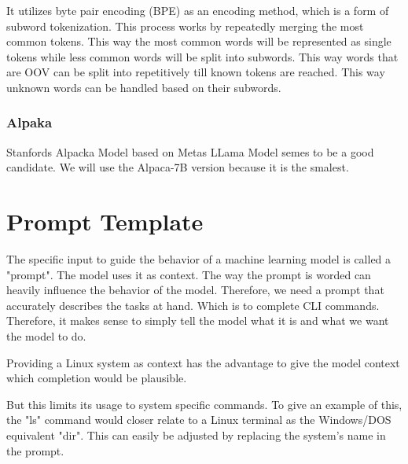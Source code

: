 It utilizes byte pair encoding (BPE) as an encoding method, which is a form of subword tokenization. This process works by repeatedly merging the most common tokens. 
This way the most common words will be represented as single tokens while less common words will be split into subwords. This way words that are OOV can be split into repetitively till known tokens are reached. This way unknown words can be handled based on their subwords.





\subsubsection{Alpaka} 
Stanfords Alpacka Model based on Metas LLama Model semes to be a good candidate.
We will use the Alpaca-7B version because it is the smalest. 



\pagebreak


\pagebreak








\section{Prompt Template}


The specific input to guide the behavior of a machine learning model is called a "prompt". The model uses it as context. The way the prompt is worded can heavily influence the behavior of the model. Therefore, we need a prompt that accurately describes the tasks at hand. Which is to complete CLI commands. Therefore, it makes sense to simply tell the model what it is and what we want the model to do. 



Providing a Linux system as context has the advantage to give the model context which completion would be plausible. 

But this limits its usage to system specific commands. To give an example of this, the "ls" command would closer relate to  a Linux terminal as the Windows/DOS equivalent "dir". This can easily be adjusted by replacing the system's name in the prompt.



  



